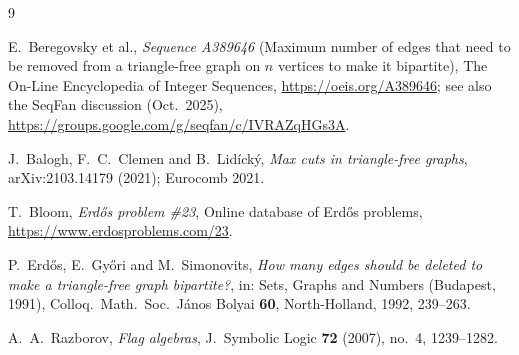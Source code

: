 \documentclass[11pt]{article}
\theoremstyle{remark}
\begin{document}
\begin{thebibliography}{9}

 E.~Beregovsky et al., \emph{Sequence A389646} (Maximum number of
edges that need to be removed from a triangle-free graph on $n$ vertices to make it
bipartite), The On-Line Encyclopedia of Integer Sequences,
\url{https://oeis.org/A389646}; see also the SeqFan discussion (Oct.\ 2025),
\url{https://groups.google.com/g/seqfan/c/IVRAZqHGs3A}.

 J.~Balogh, F.~C.~Clemen and B.~Lid\'ick\'y, \emph{Max cuts in
triangle-free graphs}, arXiv:2103.14179 (2021); Eurocomb 2021.

 T.~Bloom, \emph{Erd\H{o}s problem \#23}, Online database of
Erd\H{o}s problems, \url{https://www.erdosproblems.com/23}.

 P.~Erd\H{o}s, E.~Gy\H{o}ri and M.~Simonovits, \emph{How many edges
should be deleted to make a triangle-free graph bipartite?}, in: Sets, Graphs and
Numbers (Budapest, 1991), Colloq.\ Math.\ Soc.\ J\'anos Bolyai \textbf{60},
North-Holland, 1992, 239--263.

 A.~A.~Razborov, \emph{Flag algebras}, J.\ Symbolic Logic
\textbf{72} (2007), no.~4, 1239--1282.

\end{thebibliography}
\end{document}
